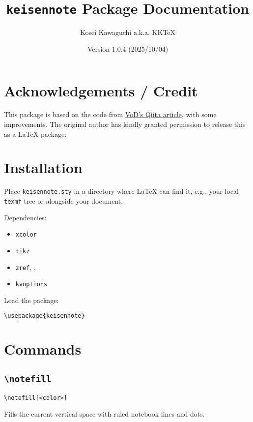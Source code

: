 \documentclass[a4paper,12pt]{article}
\title{\texttt{keisennote} Package Documentation}
\author{Kosei Kawaguchi a.k.a. KKTeX}
\date{Version 1.0.4 (2025/10/04)}
\begin{document}
\begin{titlepage}
  \maketitle
\end{titlepage}
\newpage
\tableofcontents
\newpage

\section{Acknowledgements / Credit}

This package is based on the code from 
\href{https://qiita.com/VoD/items/6849e63b978050218d2f}{VoD's Qiita article}, 
with some improvements. The original author has kindly granted permission 
to release this as a LaTeX package.

\section{Installation}

Place \texttt{keisennote.sty} in a directory where LaTeX can find it, e.g., your local \texttt{texmf} tree or alongside your document.

Dependencies:
\begin{itemize}
    \item \texttt{xcolor} 
    \item \texttt{tikz}
    \item \texttt{zref}, , 
    \item \texttt{kvoptions}
\end{itemize}


Load the package:

\begin{verbatim}
\usepackage{keisennote}
\end{verbatim}

\section{Commands}

\subsection{\texttt{\textbackslash notefill}}
\begin{verbatim}
\notefill[<color>]
\end{verbatim}

Fills the current vertical space with ruled notebook lines and dots.
\end{document}
